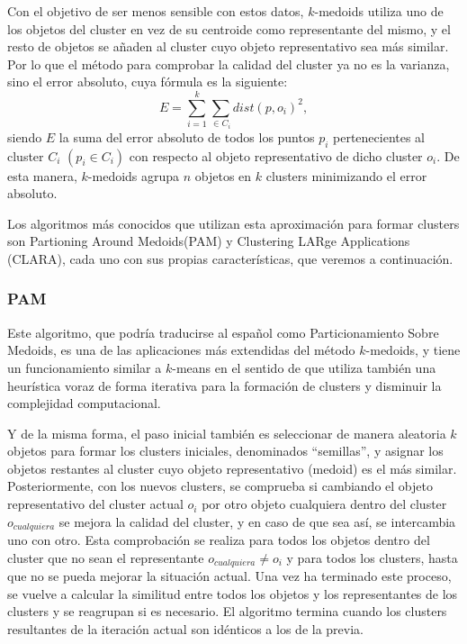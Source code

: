 \documentclass[10pt, a4paper]{article}
\begin{document}
Con el objetivo de ser menos sensible con estos datos, $k$-medoids utiliza uno de los objetos del cluster en vez de su centroide como representante del mismo, y el resto de objetos se añaden al cluster cuyo objeto representativo sea más similar. Por lo que el método para comprobar la calidad del cluster ya no es la varianza, sino el error absoluto, cuya fórmula es la siguiente: \begin{equation} \label{eq:k-medoids} E =  \sum_{i=1}^{k}  \sum_{ \in C_i} dist(p, o_i)^2 , \end{equation} siendo $E$ la suma del error absoluto de todos los puntos $p_i$ pertenecientes al cluster $C_i$ $\left(p_i \in C_i \right)$ con respecto al objeto representativo de dicho cluster $o_i$. De esta manera, $k$-medoids agrupa $n$ objetos en $k$ clusters minimizando el error absoluto. 

Los algoritmos más conocidos que utilizan esta aproximación para formar clusters son Partioning Around Medoids(PAM) y Clustering LARge Applications (CLARA), cada uno con sus propias características, que veremos a continuación.


\subsubsection{\textbf{PAM}} \label{pam}

Este algoritmo, que podría traducirse al español como Particionamiento Sobre Medoids, es una de las aplicaciones más extendidas del método $k$-medoids, y tiene un funcionamiento similar a $k$-means en el sentido de que utiliza también una heurística voraz de forma iterativa para la formación de clusters y disminuir la complejidad computacional. 

Y de la misma forma, el paso inicial también es seleccionar de manera aleatoria $k$ objetos para formar los clusters iniciales, denominados ``semillas'', y asignar los objetos restantes al cluster cuyo objeto representativo (medoid) es el más similar. Posteriormente, con los nuevos clusters, se comprueba si cambiando el objeto representativo del cluster actual $o_i$ por otro objeto cualquiera dentro del cluster $o_{cualquiera}$ se mejora la calidad del cluster, y en caso de que sea así, se intercambia uno con otro. Esta comprobación se realiza para todos los objetos dentro del cluster que no sean el representante $o_{cualquiera} \neq o_i$ y para todos los clusters, hasta que no se pueda mejorar la situación actual. Una vez ha terminado este proceso, se vuelve a calcular la similitud entre todos los objetos y los representantes de los clusters y se reagrupan si es necesario. El algoritmo termina cuando los clusters resultantes de la iteración actual son idénticos a los de la previa. 
\end{document}
